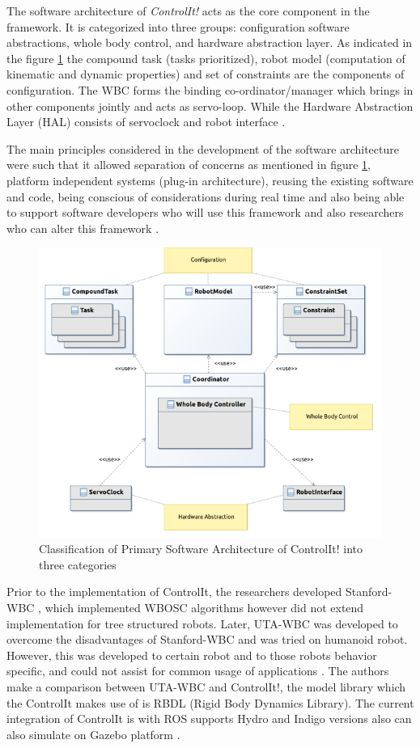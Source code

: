The software architecture of \textit{ControlIt!} acts as the core component in the framework. It is categorized into three groups: configuration software abstractions, whole body control, and hardware abstraction layer. As indicated in the figure \ref{ControlIt} the compound task (tasks prioritized), robot model (computation of kinematic and dynamic properties) and set of constraints are the components of configuration. The WBC forms the binding co-ordinator/manager which brings in other components jointly and acts as servo-loop. While the Hardware Abstraction Layer (HAL) consists of servoclock and robot interface \cite{fok2016controlit} . 


The main principles considered in the development of the software architecture were such that it allowed separation of concerns as mentioned in figure \ref{ControlIt}, platform independent systems (plug-in architecture), reusing the existing software and code, being conscious of considerations during real time and also being able to support software developers who will use this framework and also researchers who can alter this framework \cite{fok2016controlit}.
\begin{figure}
	\centering
\includegraphics[scale=0.5]{images/controlit_softwarearc}
\caption{Classification of Primary Software Architecture of ControlIt! into three categories \cite{fok2016controlit}}
\label{ControlIt}
\end{figure}
Prior to the implementation of ControlIt, the researchers developed Stanford-WBC \cite{philippsen2011open}, which implemented WBOSC algorithms however did not extend implementation for tree structured robots. Later, UTA-WBC was developed to overcome the disadvantages of Stanford-WBC and was tried on humanoid robot. However, this was developed to certain robot and to those robots behavior specific, and could not assist for common usage of applications \cite{fok2016controlit}. The authors make a comparison between UTA-WBC and ControlIt!, the model library which the ControlIt makes use of is RBDL (Rigid Body Dynamics Library). The current integration of ControlIt is with ROS supports Hydro and Indigo versions also can also simulate on Gazebo platform \cite{vukcevic2018extending}.


